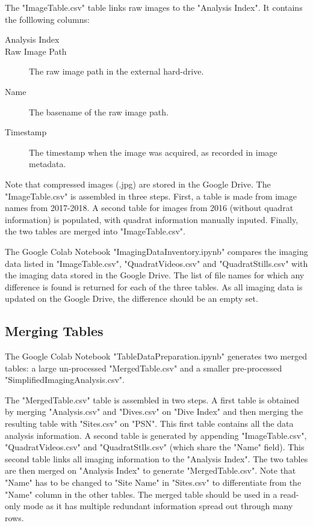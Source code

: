 \documentclass[11pt]{article} %
\begin{document}
The "ImageTable.csv" table links raw images to the "Analysis Index". It contains the folllowing columns:
\begin{description}
\item[Analysis Index]
\item[Raw Image Path] The raw image path in the external hard-drive.
\item[Name] The basename of the raw image path.
\item[Timestamp] The timestamp when the image was acquired, as recorded in image metadata.
\end{description}
Note that compressed images (.jpg) are stored in the Google Drive. The "ImageTable.csv" is assembled in three steps. First, a table is made from image names from 2017-2018. A second table for images from 2016 (without quadrat information) is populated, with quadrat information manually inputed. Finally, the two tables are merged into "ImageTable.csv".

The Google Colab Notebook "ImagingDataInventory.ipynb" compares the imaging data listed in "ImageTable.csv", "QuadratVideos.csv" and "QuadratStills.csv" with the imaging data stored in the Google Drive. The list of file names for which any difference is found is returned for each of the three tables. As all imaging data is updated on the Google Drive, the difference should be an empty set.


\subsection{Merging Tables}

The Google Colab Notebook "TableDataPreparation.ipynb" generates two merged tables: a large un-processed "MergedTable.csv" and a smaller pre-processed "SimplifiedImagingAnalysis.csv".

The "MergedTable.csv" table is assembled in two steps. A first table is obtained by merging "Analysis.csv" and "Dives.csv" on "Dive Index" and then merging the resulting table with "Sites.csv" on "PSN". This first table contains all the data analysis information. A second table is generated by appending "ImageTable.csv", "QuadratVideos.csv" and "QuadratStlls.csv" (which share the "Name" field). This second table links all imaging information to the "Analysis Index". The two tables are then merged on "Analysis Index"  to generate "MergedTable.csv". Note that "Name" has to be changed to "Site Name" in "Sites.csv" to differentiate from the "Name" column in the other tables. The merged table should be used in a read-only mode as it has multiple redundant information spread out through many rows.
\end{document}
